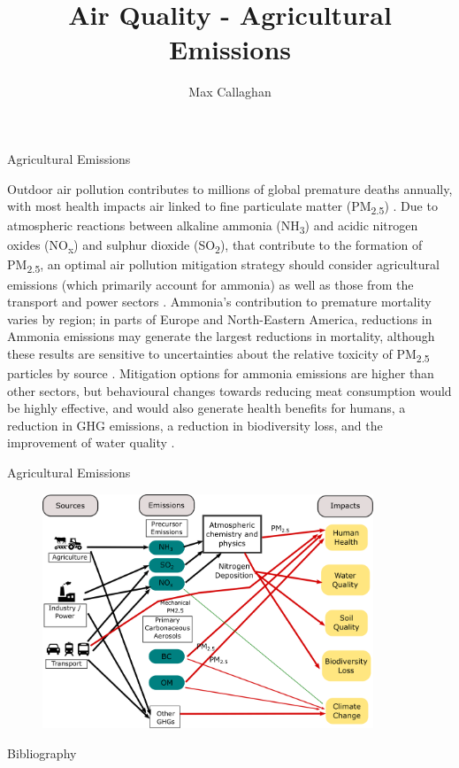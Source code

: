 \documentclass[9pt]{beamer}
\title[Air Quality]{Air Quality - Agricultural Emissions}
\subtitle{}
\author{Max Callaghan}
\institute[MCC-Berlin]%
\begin{document}
	
\begin{frame}
	\titlepage
\end{frame}


\begin{frame}{Agricultural Emissions}
	
	Outdoor air pollution contributes to millions of global premature deaths annually, with  most health impacts air linked to fine particulate matter (PM\textsubscript{2.5}) \citep{Lelieveld2015}. 	Due to atmospheric reactions between alkaline ammonia (NH\textsubscript{3}) and acidic nitrogen oxides (NO\textsubscript{x}) and sulphur dioxide (SO\textsubscript{2}), that contribute to the formation of PM\textsubscript{2.5}, an optimal air pollution mitigation strategy should consider agricultural emissions (which primarily account for ammonia) as well as those from the transport and power sectors \citep{Wang2015, Lee2015}. Ammonia's contribution to premature mortality varies by region; in parts of Europe and North-Eastern America, reductions in Ammonia emissions may generate the largest reductions in mortality, although these results are sensitive to uncertainties about the relative toxicity of PM\textsubscript{2.5} particles by source \citep{Lee2015, Lelieveld2015}. Mitigation options for ammonia emissions are higher than other sectors, but behavioural changes towards reducing meat consumption would be highly effective, and would also generate health benefits for humans, a reduction in GHG emissions, a reduction in biodiversity loss, and the improvement of water quality \citep{Backes2016, Leip2015}.  

\end{frame}

\begin{frame}{Agricultural Emissions}

\begin{figure}
\includegraphics[height=7cm]{../ammonia.png}
\end{figure}
\end{frame}

\begin{frame}{Bibliography}
	\small
	
\end{frame}
\end{document}
